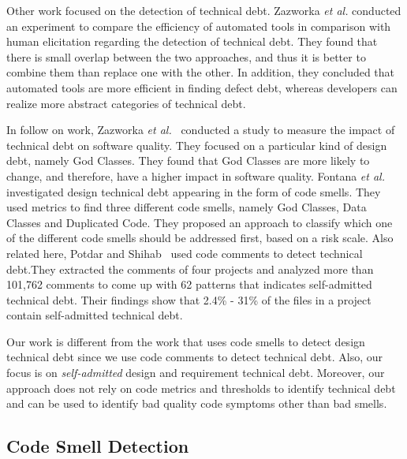 Other work focused on the detection of technical debt. Zazworka \textit{et al.} \cite{Zazworka2013CSE} conducted an experiment to compare the efficiency of automated tools in comparison with human elicitation regarding the detection of technical debt. They found that there is small overlap between the two approaches, and thus it is better to combine them than replace one with the other. In addition, they concluded that automated tools are more efficient in finding defect debt, whereas developers can realize more abstract categories of technical debt.

In follow on work, Zazworka \textit{et al.}~\cite{Zazworka2011MTD} conducted a study to measure the impact of technical debt on software quality. They focused on a particular kind of design debt, namely God Classes. They found that God Classes are more likely to change, and therefore, have a higher impact in software quality. Fontana \textit{et al.}~\cite{Fontana2012MTD} investigated design technical debt appearing in the form of code smells. They used metrics to find three different code smells, namely God Classes, Data Classes and Duplicated Code. They proposed an approach to classify which one of the different code smells should be addressed first, based on a risk scale. Also related here, Potdar and Shihab~\cite{Potdar2014ICSME} used code comments to detect technical debt.They extracted the comments of four projects and analyzed more than 101,762 comments to come up with 62  patterns that indicates self-admitted technical debt. Their findings show that 2.4\% - 31\% of the files in a project contain self-admitted technical debt.

Our work is different from the work that uses code smells to detect design technical debt since we use code comments to detect technical debt. Also, our focus is on \emph{self-admitted} design and requirement technical debt. Moreover, our approach does not rely on code metrics and thresholds to identify technical debt and can be used to identify bad quality code symptoms other than bad smells.  

\subsection{Code Smell Detection}

